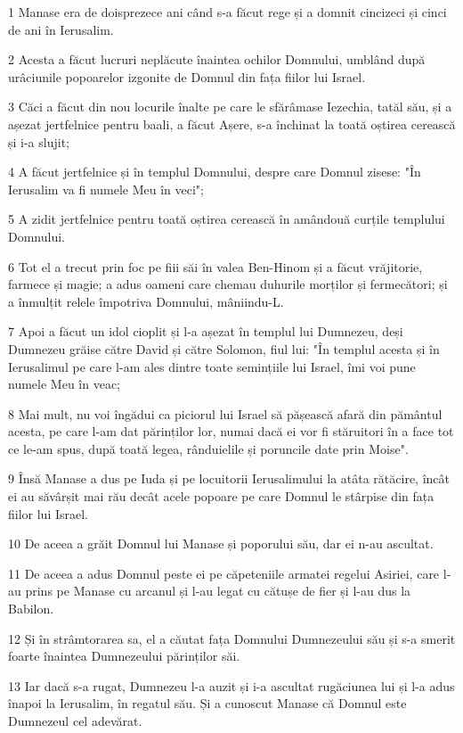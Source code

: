 \par 1 Manase era de doisprezece ani când s-a făcut rege și a domnit cincizeci și cinci de ani în Ierusalim.
\par 2 Acesta a făcut lucruri neplăcute înaintea ochilor Domnului, umblând după urâciunile popoarelor izgonite de Domnul din fața fiilor lui Israel.
\par 3 Căci a făcut din nou locurile înalte pe care le sfărâmase Iezechia, tatăl său, și a așezat jertfelnice pentru baali, a făcut Așere, s-a închinat la toată oștirea cerească și i-a slujit;
\par 4 A făcut jertfelnice și în templul Domnului, despre care Domnul zisese: "În Ierusalim va fi numele Meu în veci";
\par 5 A zidit jertfelnice pentru toată oștirea cerească în amândouă curțile templului Domnului.
\par 6 Tot el a trecut prin foc pe fiii săi în valea Ben-Hinom și a făcut vrăjitorie, farmece și magie; a adus oameni care chemau duhurile morților și fermecători; și a înmulțit relele împotriva Domnului, mâniindu-L.
\par 7 Apoi a făcut un idol cioplit și l-a așezat în templul lui Dumnezeu, deși Dumnezeu grăise către David și către Solomon, fiul lui: "În templul acesta și în Ierusalimul pe care l-am ales dintre toate semințiile lui Israel, îmi voi pune numele Meu în veac;
\par 8 Mai mult, nu voi îngădui ca piciorul lui Israel să pășească afară din pământul acesta, pe care l-am dat părinților lor, numai dacă ei vor fi stăruitori în a face tot ce le-am spus, după toată legea, rânduielile și poruncile date prin Moise".
\par 9 Însă Manase a dus pe Iuda și pe locuitorii Ierusalimului la atâta rătăcire, încât ei au săvârșit mai rău decât acele popoare pe care Domnul le stârpise din fața fiilor lui Israel.
\par 10 De aceea a grăit Domnul lui Manase și poporului său, dar ei n-au ascultat.
\par 11 De aceea a adus Domnul peste ei pe căpeteniile armatei regelui Asiriei, care l-au prins pe Manase cu arcanul și l-au legat cu cătușe de fier și l-au dus la Babilon.
\par 12 Și în strâmtorarea sa, el a căutat fața Domnului Dumnezeului său și s-a smerit foarte înaintea Dumnezeului părinților săi.
\par 13 Iar dacă s-a rugat, Dumnezeu l-a auzit și i-a ascultat rugăciunea lui și l-a adus înapoi la Ierusalim, în regatul său. Și a cunoscut Manase că Domnul este Dumnezeul cel adevărat.
